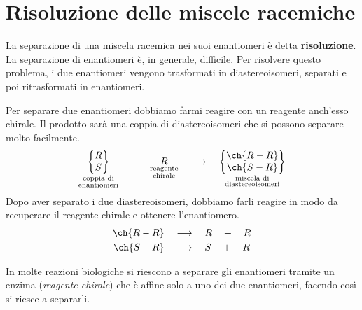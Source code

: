 \section{Risoluzione delle miscele racemiche}
La separazione di una miscela racemica nei suoi enantiomeri è detta \textbf{risoluzione}. La separazione di enantiomeri è, in generale, difficile. Per risolvere questo problema, i due enantiomeri vengono trasformati in diastereoisomeri, separati e poi ritrasformati in enantiomeri.

Per separare due enantiomeri dobbiamo farmi reagire con un reagente anch'esso chirale. Il prodotto sarà una coppia di diastereoisomeri che si possono separare molto facilmente.
\begin{equation*}
	\underset{\substack{\text{coppia di}\\\text{enantiomeri}}}{
		\begin{Bmatrix}R\\S\end{Bmatrix}}
	\quad + \quad \underset{\substack{\text{reagente}\\\text{chirale}}}{R}
	\quad\longrightarrow\quad
	\underset{\substack{\text{miscela di}\\\text{diastereoisomeri}}}{
		\begin{Bmatrix}\ch{R-R}\\\ch{S-R}\end{Bmatrix}}
\end{equation*}
Dopo aver separato i due diastereoisomeri, dobbiamo farli reagire in modo da recuperare il reagente chirale e ottenere l'enantiomero.
\begin{gather*}
	\ch{R-R} \quad\longrightarrow\quad R \quad + \quad R\\
	\ch{S-R} \quad\longrightarrow\quad S \quad + \quad R
\end{gather*}

In molte reazioni biologiche si riescono a separare gli enantiomeri tramite un enzima (\textit{reagente chirale}) che è affine solo a uno dei due enantiomeri, facendo così si riesce a separarli. 